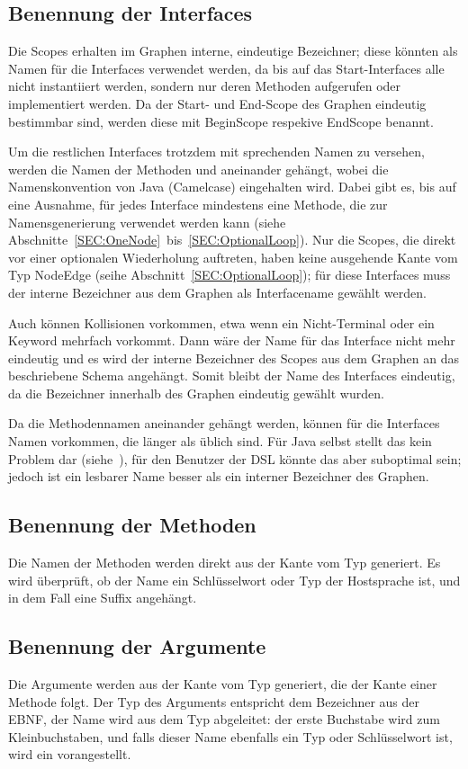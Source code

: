 \documentclass[../InterneDSLs.tex]{subfiles}
\begin{document}
\subsection{Benennung der Interfaces}
Die Scopes erhalten im Graphen interne, eindeutige Bezeichner; diese könnten als Namen für die Interfaces verwendet werden, da bis auf das Start-Interfaces alle nicht instantiiert werden, sondern nur deren Methoden aufgerufen oder implementiert werden. Da der Start- und End-Scope des Graphen eindeutig bestimmbar sind, werden diese mit BeginScope respekive EndScope benannt.

Um die restlichen Interfaces trotzdem mit sprechenden Namen zu versehen, werden die Namen der Methoden und  aneinander gehängt, wobei die Namenskonvention von Java (Camelcase) eingehalten wird. Dabei gibt es, bis auf eine Ausnahme, für jedes Interface mindestens eine Methode, die zur Namensgenerierung verwendet werden kann (siehe Abschnitte~\ref{SEC:OneNode}~bis~\ref{SEC:OptionalLoop}). Nur die Scopes, die direkt vor einer optionalen Wiederholung auftreten, haben keine ausgehende Kante vom Typ NodeEdge (seihe Abschnitt~\ref{SEC:OptionalLoop}); für diese Interfaces muss der interne Bezeichner aus dem Graphen als Interfacename gewählt werden.

Auch können Kollisionen vorkommen, etwa wenn ein Nicht-Terminal oder ein Keyword mehrfach vorkommt. Dann wäre der Name für das Interface nicht mehr eindeutig und es wird der interne Bezeichner des Scopes aus dem Graphen an das beschriebene Schema angehängt. Somit bleibt der Name des Interfaces eindeutig, da die Bezeichner innerhalb des Graphen eindeutig gewählt wurden.

Da die Methodennamen aneinander gehängt werden, können für die Interfaces Namen vorkommen, die länger als üblich sind. Für Java selbst stellt das kein Problem dar (siehe~\cite[S. 24]{javalanguagespecification.oracle}), für den Benutzer der DSL könnte das aber suboptimal sein; jedoch ist ein lesbarer Name besser als ein interner Bezeichner des Graphen.

\subsection{Benennung der Methoden}
Die Namen der Methoden werden direkt aus der Kante vom Typ  generiert. Es wird überprüft, ob der Name ein Schlüsselwort oder Typ der Hostsprache ist, und in dem Fall eine Suffix angehängt.

\subsection{Benennung der Argumente}
Die Argumente werden aus der Kante vom Typ  generiert, die der Kante einer Methode folgt. Der Typ des Arguments entspricht dem Bezeichner aus der EBNF, der Name wird aus dem Typ abgeleitet: der erste Buchstabe wird zum Kleinbuchstaben, und falls dieser Name ebenfalls ein Typ oder Schlüsselwort ist, wird ein  vorangestellt.
\end{document}
